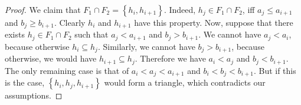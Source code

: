 \documentclass[12pt]{article}
\theoremstyle{definition}
\begin{document}
\begin{proof}
        We claim that $F_1 \cap F_2 = 
        \left\{h_{i}, h_{i+1}\right\}$.
        Indeed, $h_{j} \in 
        F_1 \cap F_2$, 
        iff $a_{j} \leq a_{i+1}$ 
        and $b_{j} \geq b_{i+1}$.
        Clearly $h_{i}$ and
        $h_{i+1}$ have this
        property.
        Now, suppose that there
        exists $h_{j} \in F_1 \cap F_2$
        such that $a_{j} < a_{i+1}$
        and $b_{j} > b_{i+1}$.
        We cannot have $a_{j} < a_{i}$,
        because otherwise $h_{i} \subseteq h_{j}$.
        Similarly, we cannot have $b_{j} > b_{i+1}$,
        because otherwise, we would
        have $h_{i+1} \subseteq h_{j}$.
        Therefore we have $a_{i} < a_{j}$ 
        and $b_{j} < b_{i+1}$.
        The only remaining case is
        that of $a_{i} < a_{j} < a_{i+1}$ 
        and $b_{i} < b_{j} < b_{i+1}$.
        But if this is the case,
        $\left\{h_{i}, h_{j}, h_{i+1}\right\}$ would
        form a triangle, which
        contradicts our assumptions.
        

\end{proof}
\end{document}
